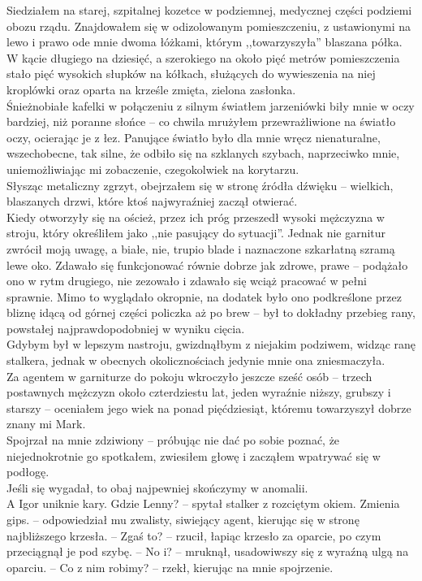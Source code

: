 \documentclass[../MAIN.tex]{subfiles}
\begin{document}
Siedziałem na starej, szpitalnej kozetce w podziemnej, medycznej części podziemi obozu rządu. Znajdowałem się w odizolowanym pomieszczeniu, z ustawionymi na lewo i prawo ode mnie dwoma łóżkami, którym ,,towarzyszyła'' blaszana półka. W kącie długiego na dziesięć, a szerokiego na około pięć metrów pomieszczenia stało pięć wysokich słupków na kółkach, służących do wywieszenia na niej kroplówki oraz oparta na krześle zmięta, zielona zasłonka.\\
Śnieżnobiałe kafelki w połączeniu z silnym światłem jarzeniówki biły mnie w oczy bardziej, niż poranne słońce -- co chwila mrużyłem przewrażliwione na światło oczy, ocierając je z łez. Panujące światło było dla mnie wręcz nienaturalne, wszechobecne, tak silne, że odbiło się na szklanych szybach, naprzeciwko mnie, uniemożliwiając mi zobaczenie, czegokolwiek na korytarzu.\\
Słysząc metaliczny zgrzyt, obejrzałem się w stronę źródła dźwięku -- wielkich, blaszanych drzwi, które ktoś najwyraźniej zaczął otwierać.\\
Kiedy otworzyły się na oścież, przez ich próg przeszedł wysoki mężczyzna w stroju, który określiłem jako ,,nie pasujący do sytuacji''. Jednak nie garnitur zwrócił moją uwagę, a białe, nie, trupio blade i naznaczone szkarłatną szramą lewe oko. Zdawało się funkcjonować równie dobrze jak zdrowe, prawe -- podążało ono w rytm drugiego, nie zezowało i zdawało się wciąż pracować w pełni sprawnie. Mimo to wyglądało okropnie, na dodatek było ono podkreślone przez bliznę idącą od górnej części policzka aż po brew -- był to dokładny przebieg rany, powstałej najprawdopodobniej w wyniku cięcia.\\
Gdybym był w lepszym nastroju, gwizdnąłbym z niejakim podziwem, widząc ranę stalkera, jednak w obecnych okolicznościach jedynie mnie ona zniesmaczyła.\\
Za agentem w garniturze do pokoju wkroczyło jeszcze sześć osób -- trzech postawnych mężczyzn około czterdziestu lat, jeden wyraźnie niższy, grubszy i starszy -- oceniałem jego wiek na ponad pięćdziesiąt, któremu towarzyszył dobrze znany mi Mark.\\
Spojrzał na mnie zdziwiony -- próbując nie dać po sobie poznać, że niejednokrotnie go spotkałem, zwiesiłem głowę i zacząłem wpatrywać się w podłogę.\\
Jeśli się wygadał, to obaj najpewniej skończymy w anomalii.\\
A Igor uniknie kary.
\sx Gdzie Lenny? -- spytał stalker z rozciętym okiem.
\xx Zmienia gips. -- odpowiedział mu zwalisty, siwiejący agent, kierując się w stronę najbliższego krzesła. -- Zgaś to? -- rzucił, łapiąc krzesło za oparcie, po czym przeciągnął je pod szybę. -- No i? -- mruknął, usadowiwszy się z wyraźną ulgą na oparciu. -- Co z nim robimy? -- rzekł, kierując na mnie spojrzenie.
\end{document}
